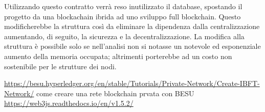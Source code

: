 \documentclass[11pt,a4paper,titlepage,twoside,openright]{report}
\begin{document}
Utilizzando questo contratto verrà reso inutilizzato il database, spostando il progetto da una blockachain ibrida ad uno sviluppo full blockchain. Questo modificherebbe la struttura così da eliminare la dipendenza dalla centralizzazione aumentando, di seguito, la sicurezza e la decentralizzazione. La modifica alla struttura è possibile solo se nell'analisi non si notasse un notevole ed esponenziale aumento della memoria occupata; altrimenti porterebbe ad un costo non sostenibile per le strutture dei nodi.

\begin{thebibliography}{1}
\bibitem{} \url{https://besu.hyperledger.org/en/stable/Tutorials/Private-Network/Create-IBFT-Network/} come creare una rete blockchain prvata con BESU
\bibitem{} \url{https://web3js.readthedocs.io/en/v1.5.2/}
\end{thebibliography}

\listoffigures
\end{document}
